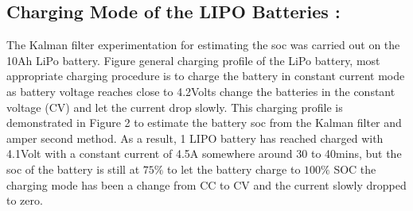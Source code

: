 \subsection{Charging Mode of the LIPO Batteries :}
The Kalman filter experimentation for estimating the soc was carried out on the 10Ah LiPo battery. Figure general charging profile of the LiPo battery, most appropriate charging procedure is to charge the battery in constant current mode as battery voltage reaches close to 4.2Volts change the batteries in the constant voltage (CV) and let the current drop slowly. This charging profile is demonstrated in Figure 2 to estimate the battery soc from the Kalman filter and amper second method. As a result, 1 LIPO battery has reached charged with 4.1Volt with a constant current of 4.5A somewhere around 30 to 40mins, but the soc of the battery is still at $75\%$ to let the battery charge to $100\%$ SOC the charging mode has been a change from CC to CV and the current slowly dropped to zero.
